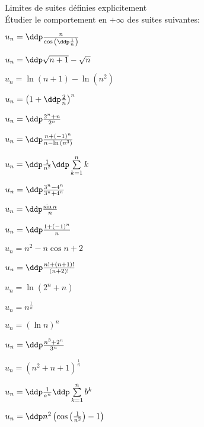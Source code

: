 



\begin{exercice} \; Limites de suites d\'efinies explicitement\\
\noindent \'Etudier le comportement en $+\infty$ des suites suivantes:\\
\begin{enumerate}
\begin{minipage}[t]{0.3\textwidth}
\item
$u_n=\ddp\frac{n}{\cos{\left(\ddp\frac{1}{n}  \right)}}$
\item
$u_n=\ddp\sqrt{n+1}-\sqrt{n}$
\item 
$u_n=\ln{(n+1)}-\ln{(n^2)}$
\item  
$u_n=\left(1+\ddp\frac{2}{n}\right)^n$
\item  
$u_n=\ddp\frac{2^n+n}{2^n}$
\item  $u_n=\ddp\frac{n+(-1)^n}{n-\ln{(n^3)}}$
\end{minipage}
\begin{minipage}[t]{0.3\textwidth}
\item  
$u_n=\ddp\frac{1}{n^2}\ddp \sum\limits_{k=1}^n k$
 \item 
$u_n=\ddp\frac{3^n-4^n}{3^n+4^n}$
\item  
$u_n=\ddp\frac{\sin{n}}{n}$
\item  
$u_n=\ddp\frac{1+(-1)^n}{n}$
\item  
$u_n=n^2-n\cos{n}+2$
\item  $u_n=\ddp\frac{n!+(n+1)!}{(n+2)!}$
\end{minipage}
\begin{minipage}[t]{0.3\textwidth}
 \item 
$u_n=\ln{(2^n+n)}$
\item $u_n=n^{\frac{1}{n}}$  
\item   $u_n=(\ln{n})^n$
\item  $u_n=\ddp\frac{n^3+2^n}{3^n}$ 
\item $u_n=(n^2+n+1)^{\frac{1}{n}}$  
\item $u_n=\ddp\frac{1}{a^n}\ddp \sum\limits_{k=1}^n b^k$  
\item $u_n = \ddp n^2 \left(\cos\left(\frac{1}{n^2}\right)-1\right)$
\end{minipage}
\end{enumerate}
\end{exercice}


